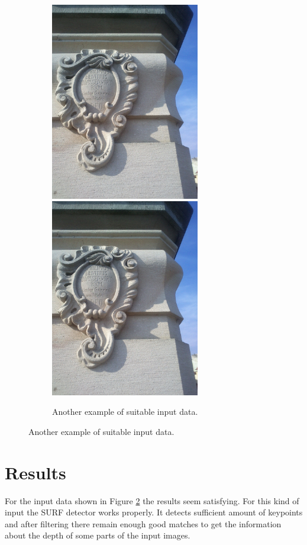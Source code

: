 \begin{figure}[H]
\begin{subfigure}[b]{0.45\textwidth}
\includegraphics[width=6.5cm]{img/memorial_b.png}
\centering
\includegraphics[width=6.5cm]{img/memorial_b.png}
\caption{Another example of suitable input data.} \label{sample2}
\end{subfigure}
\label{fig:input_samples}
\end{figure}





\section{Results}
For the input data shown in Figure \ref{fig:input_samples} the results seem satisfying.
For this kind of input the SURF detector works properly.
It detects sufficient amount of keypoints and after filtering there remain enough good matches to get the information about the depth of some parts of the input images.

